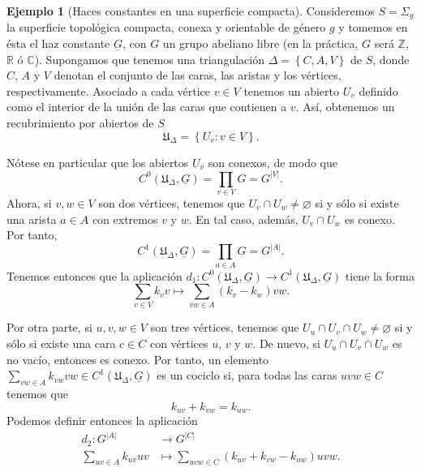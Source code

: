 \documentclass[12pt,a4paper]{article}
\theoremstyle{definition} \newtheorem{defn}[thm]{Definición}
\theoremstyle{definition} \newtheorem{ejemplo}[thm]{Ejemplo}
\theoremstyle{definition} \newtheorem{ejercicio}[thm]{Ejercicio}
\def\UU{\mathfrak{U}}
\begin{document}
\begin{ejemplo}[Haces constantes en una superficie compacta]
  Consideremos $S= \Sigma_g$ la superficie topológica compacta, conexa y orientable de género $g$ y tomemos en ésta el haz constante $\underline{G}$, con $G$ un grupo abeliano libre (en la práctica, $G$ será $\mathbb{Z}$, $\mathbb{R}$ ó $\mathbb{C}$). Supongamos que tenemos una triangulación $\Delta=\left\{ C,A,V \right\}$ de $S$, donde $C$, $A$ y $V$ denotan el conjunto de las caras, las aristas y los vértices, respectivamente. Asociado a cada vértice $v \in V$ tenemos un abierto $U_v$ definido como el interior de la unión de las caras que contienen a $v$. Así, obtenemos un recubrimiento por abiertos de $S$
  \begin{equation*}
    \UU_{\Delta} = \left\{ U_v: v\in V \right\}.
  \end{equation*}

  Nótese en particular que los abiertos $U_v$ son conexos, de modo que 
  \begin{equation*}
    C^0(\UU_\Delta, \underline{G}) = \prod_{v\in V} G = G^{|V|}.
  \end{equation*}
  Ahora, si $v,w \in V$ son dos vértices, tenemos que $U_v \cap U_w \neq \varnothing$ si y sólo si existe una arista $a \in A$ con extremos $v$ y $w$. En tal caso, además, $U_v \cap U_w$ es conexo. Por tanto,
  \begin{equation*}
    C^1(\UU_\Delta, \underline{G}) = \prod_{a \in A} G = G^{|A|}.
  \end{equation*}
  Tenemos entonces que la aplicación $d_1: C^0(\UU_\Delta,\underline{G}) \rightarrow C^1(\UU_\Delta,\underline{G})$ tiene la forma
  \begin{equation*}
    \sum_{v\in V} k_v v \longmapsto  \sum_{vw \in A} (k_{v} - k_{w}) vw.
  \end{equation*}

  Por otra parte, si $u,v,w \in V$ son tres vértices, tenemos que $U_u \cap U_v \cap U_w \neq \varnothing$ si y sólo si existe una cara $c \in C$ con vértices $u$, $v$ y $w$. De nuevo, si $U_u \cap U_v \cap U_w$ es no vacío, entonces es conexo. Por tanto, un elemento $\sum_{vw\in A} k_{vw} vw \in C^1(\UU_\Delta,\underline{G})$ es un cociclo si, para todas las caras $uvw \in C$ tenemos que
  \begin{equation*}
    k_{uv} + k_{vw} = k_{uw}.
  \end{equation*}
 Podemos definir entonces la aplicación
  \begin{align*}
    d_2 : G^{|A|} &\longrightarrow G^{|C|}\\ 
    \sum_{uv \in A} k_{uv} uv &\longmapsto \sum_{uvw \in C} (k_{uv} + k_{vw} - k_{uw})uvw . 
    \end{align*}


\end{ejemplo}
\end{document}
